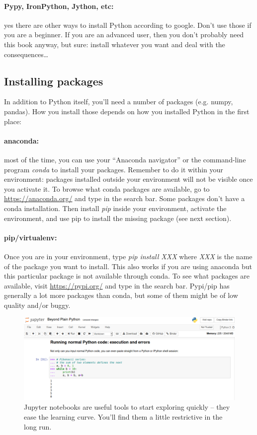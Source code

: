 \documentclass[12pt,a4paper,notitlepage,onecolumn]{article}
\begin{document}
\paragraph{Pypy, IronPython, Jython, etc:} yes there are other ways to install Python according to google. Don't use those if you are a beginner. If you are an advanced user, then you don't probably need this book anyway, but sure: install whatever you want and deal with the consequences\dots

\subsection{Installing packages}
In addition to Python itself, you'll need a number of packages (e.g. numpy, pandas). How you install those depends on how you installed Python in the first place:

\paragraph{anaconda:} most of the time, you can use your ``Anaconda navigator'' or the command-line program \textit{conda} to install your packages. Remember to do it within your environment: packages installed outside your environment will not be visible once you activate it. To browse what conda packages are available, go to \url{https://anaconda.org/} and type in the search bar. Some packages don't have a conda installation. Then install \textit{pip} inside your environment, activate the environment, and use pip to install the missing package (see next section).

\paragraph{pip/virtualenv:} Once you are in your environment, type \textit{pip install XXX} where \textit{XXX} is the name of the package you want to install. This also works if you are using anaconda but this particular package is not available through conda. To see what packages are available, visit \url{https://pypi.org/} and type in the search bar. Pypi/pip has generally a lot more packages than conda, but some of them might be of low quality and/or buggy.

\begin{figure}
\begin{center}
\includegraphics[width=\linewidth]{jupyter_screenshot.png}
\caption{Jupyter notebooks are useful tools to start exploring quickly -- they ease the learning curve. You'll find them a little restrictive in the long run.}
\label{fig:jupyter}
\end{center}
\end{figure}
\end{document}
